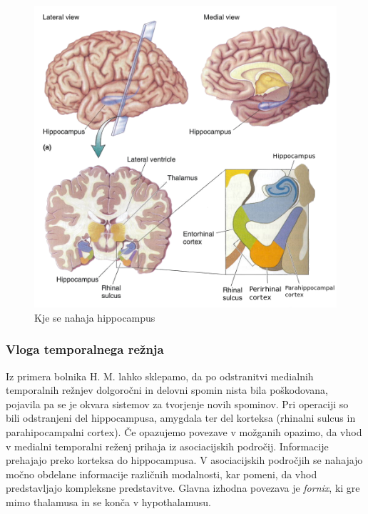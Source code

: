 \documentclass[10pt,a4paper]{article}
\begin{document}
\begin{figure}[h]
  \centering
    \includegraphics[width=1.0\textwidth]{LokacijaHippocampusa.png}
  \caption{Kje se nahaja hippocampus~\cite{Bear2001}}
  \label{sHippocampus}
\end{figure}

\subsubsection{Vloga temporalnega režnja}
Iz primera bolnika H. M. lahko sklepamo, da po odstranitvi medialnih temporalnih režnjev dolgoročni in delovni spomin nista bila poškodovana, pojavila pa se je okvara sistemov za tvorjenje novih spominov. Pri operaciji so bili odstranjeni del hippocampusa, amygdala ter del korteksa (rhinalni sulcus in parahipocampalni cortex). Če opazujemo povezave v možganih opazimo, da vhod v medialni temporalni reženj prihaja iz asociacijskih področij. Informacije prehajajo preko korteksa do hippocampusa. V asociacijskih področjih se nahajajo močno obdelane informacije različnih modalnosti, kar pomeni, da vhod predstavljajo kompleksne predstavitve. Glavna izhodna povezava je {\it fornix}, ki gre mimo thalamusa in se konča v hypothalamusu.
\end{document}
